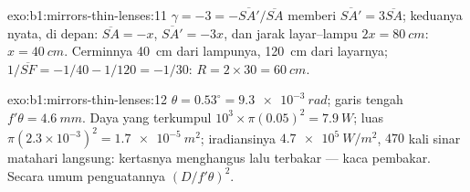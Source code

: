 \begin{solution}{exo:b1:mirrors-thin-lenses:11}
$\gamma = -3 = -\overline{SA'}/\overline{SA}$ memberi $\overline{SA'} =
3\overline{SA}$; keduanya nyata, di depan: $\overline{SA} = -x$,
$\overline{SA'} = -3x$, dan jarak layar--lampu $2x = \qty{80}{cm}$:
$x = \qty{40}{cm}$. Cerminnya \qty{40}{cm} dari lampunya, \qty{120}{cm}
dari layarnya; $1/\overline{SF} = -1/40 - 1/120 = -1/30$:
$R = 2 \times 30 = \qty{60}{cm}$.
\end{solution}

\begin{solution}{exo:b1:mirrors-thin-lenses:12}
$\theta = 0.53^\circ = \qty{9.3e-3}{rad}$; garis tengah  $f'\theta =
\qty{4.6}{mm}$. Daya yang terkumpul $10^3 \times \pi(0.05)^2 = \qty{7.9}{W}$;
luas  $\pi(2.3\times10^{-3})^2 = \qty{1.7e-5}{m^2}$; iradiansinya
$\qty{4.7e5}{W/m^2}$, $470$ kali sinar matahari langsung: kertasnya
menghangus lalu terbakar --- kaca pembakar. Secara umum penguatannya
$(D/f'\theta)^2$.
\end{solution}


